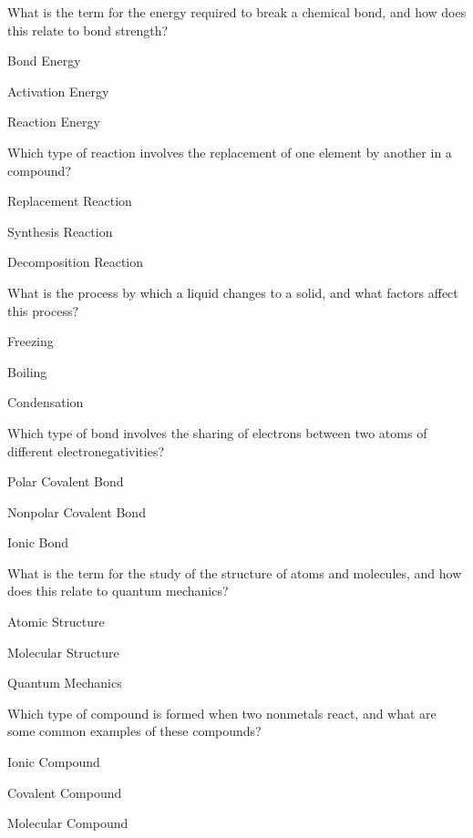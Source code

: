 \begin{enhancedmcq}{What is the term for the energy required to break a chemical bond, and how does this relate to bond strength?}
\item Bond Energy
\item Activation Energy
\item Reaction Energy

\end{enhancedmcq}
\begin{enhancedmcq}{Which type of reaction involves the replacement of one element by another in a compound?}
\item Replacement Reaction
\item Synthesis Reaction
\item Decomposition Reaction

\end{enhancedmcq}
\begin{enhancedmcq}{What is the process by which a liquid changes to a solid, and what factors affect this process?}
\item Freezing
\item Boiling
\item Condensation

\end{enhancedmcq}
\begin{enhancedmcq}{Which type of bond involves the sharing of electrons between two atoms of different electronegativities?}
\item Polar Covalent Bond
\item Nonpolar Covalent Bond
\item Ionic Bond

\end{enhancedmcq}
\begin{enhancedmcq}{What is the term for the study of the structure of atoms and molecules, and how does this relate to quantum mechanics?}
\item Atomic Structure
\item Molecular Structure
\item Quantum Mechanics

\end{enhancedmcq}
\begin{enhancedmcq}{Which type of compound is formed when two nonmetals react, and what are some common examples of these compounds?}
\item Ionic Compound
\item Covalent Compound
\item Molecular Compound

\end{enhancedmcq}
